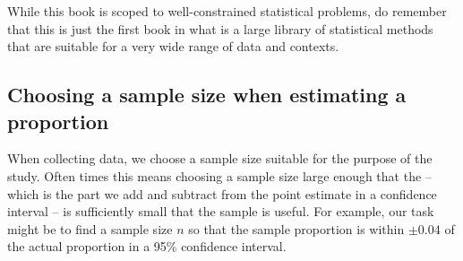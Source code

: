 While this book is scoped to well-constrained statistical
problems, do remember that this is just the first
book in what is a large library of statistical methods that
are suitable for a very wide range of data and contexts.


\D{\newpage}

\subsection{Choosing a sample size when estimating a proportion}


When collecting data, we choose a sample size suitable
for the purpose of the study.
Often times this means choosing a sample size large
enough that the  --
which is the part we add and subtract from the point
estimate in a confidence interval --
is sufficiently small that the sample is useful.
For example, our task might be to find a sample size
$n$ so that the sample proportion is within $\pm 0.04$
of the actual proportion in a 95\% confidence interval.




